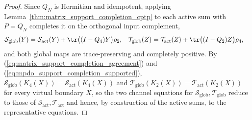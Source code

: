 \begin{proof}
    Since $Q_N$ is Hermitian and idempotent, applying
    Lemma~\ref{thm:matrix_support_completion_cptp} to each active sum
    with $P=Q_N$ completes it on the orthogonal input complement,
    \begin{align}
        \mathcal S_{\mathrm{glob}}(Y)   & =\mathcal S_{\mathrm{act}}(Y)
        +\tr\bigl((I-Q_4)Y\bigr)\rho_2, &
        \mathcal T_{\mathrm{glob}}(Z)   & =\mathcal T_{\mathrm{act}}(Z)
        +\tr\bigl((I-Q_2)Z\bigr)\rho_4,
        \notag
    \end{align}
    and both global maps are trace-preserving and completely positive. By
    (\ref{eq:matrix_support_completion_agreement}) and
    (\ref{eq:mpdo_support_completion_supported}),
    $\mathcal S_{\mathrm{glob}}(K_4(X))=\mathcal S_{\mathrm{act}}(K_4(X))$ and
    $\mathcal T_{\mathrm{glob}}(K_2(X))=\mathcal T_{\mathrm{act}}(K_2(X))$ for
    every virtual boundary $X$, so the two channel equations for
    $\mathcal S_{\mathrm{glob}},\mathcal T_{\mathrm{glob}}$ reduce to those of
    $\mathcal S_{\mathrm{act}},\mathcal T_{\mathrm{act}}$ and hence, by
    construction of the active sums, to the representative equations.
\end{proof}

